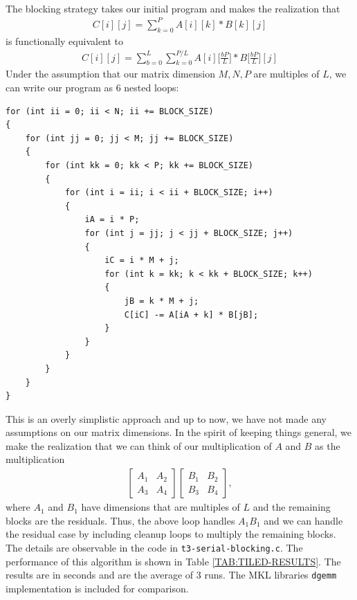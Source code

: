 \documentclass{article}
\begin{document}
\

\noindent The blocking strategy takes our initial program and makes the realization that 
\begin{align*}
    C[i][j] = \sum_{k = 0}^P A[i][k] * B[k][j]
\end{align*}
is functionally equivalent to 
\begin{align*}
    C[i][j] = \sum_{b = 0}^L \sum_{k = 0}^{P / L} A[i]\bigg[\frac{bP}{L}\bigg] * B\bigg[\frac{bP}{L}\bigg][j] 
\end{align*}
Under the assumption that our matrix dimension $M, N, P$ are multiples of $L$, we can write 
our program as 6 nested loops:
\begin{lstlisting}
for (int ii = 0; ii < N; ii += BLOCK_SIZE)
{
    for (int jj = 0; jj < M; jj += BLOCK_SIZE)
    {
        for (int kk = 0; kk < P; kk += BLOCK_SIZE)
        {
            for (int i = ii; i < ii + BLOCK_SIZE; i++)
            {
                iA = i * P;
                for (int j = jj; j < jj + BLOCK_SIZE; j++)
                {
                    iC = i * M + j;
                    for (int k = kk; k < kk + BLOCK_SIZE; k++)
                    {
                        jB = k * M + j;
                        C[iC] -= A[iA + k] * B[jB];
                    }
                }
            }
        }
    }
}
\end{lstlisting}
This is an overly simplistic approach and up to now, we have not made any assumptions 
on our matrix dimensions. In the spirit of keeping things general, we make the realization 
that we can think of our multiplication of $A$ and $B$ as the multiplication 
\begin{align*}
    \begin{bmatrix}
        A_{1} & A_{2} \\ A_{3} & A_{4}
    \end{bmatrix}
    \begin{bmatrix}
        B_{1} & B_{2} \\ B_{3} & B_{4}
    \end{bmatrix},
\end{align*}
where $A_{1}$ and $B_{1}$ have dimensions that are multiples of $L$ and the remaining blocks are the residuals. 
Thus, the above loop handles $A_1 B_1$ and we can handle the residual case by including cleanup loops
to multiply the remaining blocks. The details are observable in the code in \texttt{t3-serial-blocking.c}. 
The performance of this algorithm is shown in Table \ref{TAB:TILED-RESULTS}. The results are in seconds and
are the average of 3 runs. The MKL libraries \texttt{dgemm} implementation is included for comparison.
\end{document}
